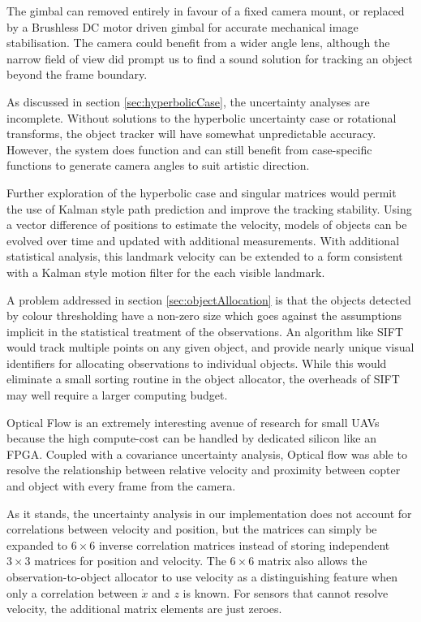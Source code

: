 \documentclass{article}
\begin{document}
  The gimbal can removed entirely in favour of a fixed camera mount, or replaced by a Brushless DC motor driven gimbal for accurate mechanical image stabilisation.  The camera could benefit from a wider angle lens, although the narrow field of view did prompt us to find a sound solution for tracking an object beyond the frame boundary.

  As discussed in section \ref{sec:hyperbolicCase}, the uncertainty analyses are incomplete.
  Without solutions to the hyperbolic uncertainty case or rotational transforms, the object tracker will have somewhat unpredictable accuracy.  However, the system does function and can still benefit from case-specific functions to generate camera angles to suit artistic direction.

  Further exploration of the hyperbolic case and singular matrices would permit the use of Kalman style path prediction and improve the tracking stability.
  Using a vector difference of positions to estimate the velocity, models of objects can be evolved over time and updated with additional measurements.  With additional statistical analysis, this landmark velocity can be extended to a form consistent with a Kalman style motion filter for the each visible landmark.

  A problem addressed in section \ref{sec:objectAllocation} is that the objects detected by colour thresholding have a non-zero size which goes against the assumptions implicit in the statistical treatment of the observations.  An algorithm like SIFT would track multiple points on any given object, and provide nearly unique visual identifiers for allocating observations to individual objects.  While this would eliminate a small sorting routine in the object allocator, the overheads of SIFT may well require a larger computing budget.

  Optical Flow is an extremely interesting avenue of research for small UAVs because the high compute-cost can be handled by dedicated silicon like an FPGA.  Coupled with a covariance uncertainty analysis, Optical flow was able to resolve the relationship between relative velocity and proximity between copter and object with every frame from the camera.  
  
  As it stands, the uncertainty analysis in our implementation does not account for correlations between velocity and position, but the matrices can simply be expanded to \(6\times6\) inverse correlation matrices instead of storing independent \(3\times3\) matrices for position and velocity.  The \(6\times6\) matrix also allows the observation-to-object allocator to use velocity as a distinguishing feature when only a correlation between \(\dot{x}\) and \(z\) is known.  For sensors that cannot resolve velocity, the additional matrix elements are just zeroes.
\end{document}
